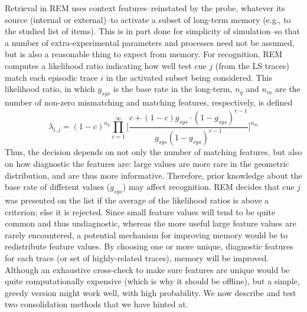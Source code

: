 \documentclass[10pt,letterpaper]{article}
\begin{document}
Retrieval in REM uses context features--reinstated by the probe, whatever its source (internal or external)--to activate a subset of long-term memory (e.g., to the studied list of items). This is in part done for simplicity of simulation--so that a number of extra-experimental parameters and processes need not be assumed, but is also a reasonable thing to expect from memory. For recognition, REM computes a likelihood ratio indicating how well test cue $j$ (from the LS traces) match each episodic trace $i$ in the activated subset being considered. This likelihood ratio, in which $g_{sys}$ is the base rate in the long-term, $n_q$ and $n_m$ are the number of non-zero mismatching and matching features, respectively, is defined
\begin{equation} \label{eq:remlik}
\lambda_{i,j} = (1-c)^{n_q} \prod_{v=1}^{\infty} \Big[ \frac{ c + (1-c) g_{sys} \cdot (1-g_{sys})^{v-1} }{ g_{sys}(1-g_{sys})^{v-1} } \Big] ^{n_{m}}
\end{equation}
Thus, the decision depends on not only the number of matching features, but also on how diagnostic the features are: large values are more rare in the geometric distribution, and are thus more informative. Therefore, prior knowledge about the base rate of different values ($g_{sys}$) may affect recognition. REM decides that cue $j$ was presented on the list if the average of the likelihood ratios is above a criterion; else it is rejected. Since small feature values will tend to be quite common and thus undiagnostic, whereas the more useful large feature values are rarely encountered, a potential mechanism for improving memory would be to redistribute feature values. By choosing one or more unique, diagnostic features for each trace (or set of highly-related traces), memory will be improved. Although an exhaustive cross-check to make sure features are unique would be quite computationally expensive (which is why it should be offline), but a simple, greedy version might work well, with high probability. We now describe and test two consolidation methods that we have hinted at.
\vspace{-.1cm}
\end{document}
